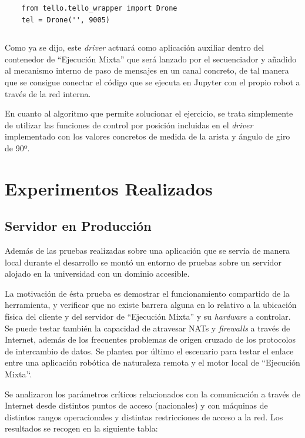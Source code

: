 \begin{verbatim}
    from tello.tello_wrapper import Drone
    tel = Drone('', 9005)
\end{verbatim}
\begin{lstlisting}[caption=Uso del Driver]
\end{lstlisting}

Como ya se dijo, este \textit{driver} actuará como aplicación auxiliar dentro del contenedor de ``Ejecución Mixta'' que será lanzado por el secuenciador y añadido al mecanismo interno de paso de mensajes en un canal concreto, de tal manera que se consigue conectar el código que se ejecuta en Jupyter con el propio robot a través de la red interna.

En cuanto al algoritmo que permite solucionar el ejercicio, se trata simplemente de utilizar las funciones de control por posición incluidas en el \textit{driver} implementado con los valores concretos de medida de la arista y ángulo de giro de 90º.

\section{Experimentos Realizados}

\subsection{Servidor en Producción}  
Además de las pruebas realizadas sobre una aplicación que se servía de manera local durante el desarrollo se montó un entorno de pruebas sobre un servidor alojado en la universidad con un dominio accesible.

La motivación de ésta prueba es demostrar el funcionamiento compartido de la herramienta, y verificar que no existe barrera alguna en lo relativo a la ubicación física del cliente y del servidor de ``Ejecución Mixta'' y su \textit{hardware} a controlar. Se puede testar también la capacidad de atravesar NATs y \textit{firewalls} a través de Internet, además de los frecuentes problemas de origen cruzado de los protocolos de intercambio de datos. Se plantea por último el escenario para testar el enlace entre una aplicación robótica de naturaleza remota y el motor local de ``Ejecución Mixta'`.

Se analizaron los parámetros críticos relacionados con la comunicación a través de Internet desde distintos puntos de acceso (nacionales) y con máquinas de distintos rangos operacionales y distintas restricciones de acceso a la red. Los resultados se recogen en la siguiente tabla:

